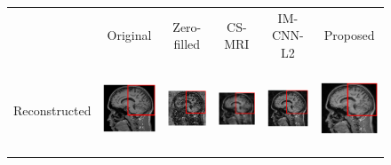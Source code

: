 \documentclass[review]{elsarticle}
\begin{document}
\begin{figure}[H]
	\begin{raggedleft}
		\hspace*{-2cm} \begin{tabular}{cccccc}
			& \multicolumn{1}{c}{\footnotesize Original} & {\footnotesize Zero-filled} & {\footnotesize CS-MRI} & {\footnotesize IM-CNN-L2} & {\footnotesize Proposed}\tabularnewline
			\multirow{1}{0.05cm}[1.8cm]{\begin{turn}{90} {\footnotesize Reconstructed} \end{turn}} &
			
			\includegraphics[width=2.5cm,height=2.5cm]{include/grp2/factor6/022-Guys-0701-T1/022-Guys-0701-T1_images__50} &
			\includegraphics[width=2.5cm,height=2.5cm]{include/grp2/factor6/022-Guys-0701-T1/022-Guys-0701-T1_images__zeroPadding_50} & \includegraphics[width=2.5cm,height=2.5cm]{include/grp2/factor6/022-Guys-0701-T1/022-Guys-0701-T1_images__CS_50} & \includegraphics[width=2.5cm,height=2.5cm]{include/grp2/factor6/022-Guys-0701-T1/022-Guys-0701-T1_images__IMCNNL2TUNE_50} & \includegraphics[width=2.5cm,height=2.5cm]{include/grp2/factor6/022-Guys-0701-T1/022-Guys-0701-T1_images__predict_50}
			

\end{tabular}
\end{raggedleft}
\end{figure}
\end{document}
